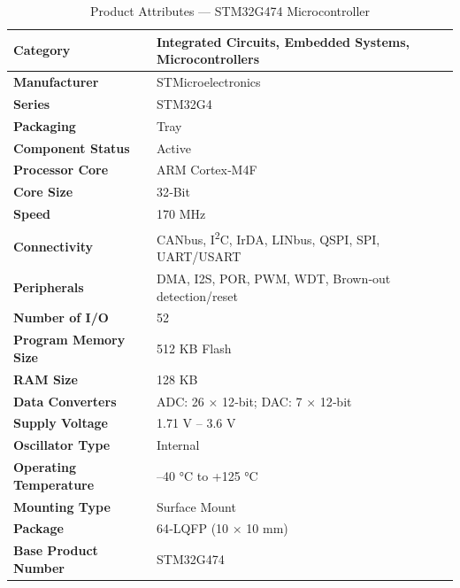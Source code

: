 \begin{table}[H]
    \centering
    \caption{Product Attributes — STM32G474 Microcontroller}
    \label{tab:stm32g474_attributes}
    \begin{tabular}{|l|l|}
        \hline
        \textbf{Category} & Integrated Circuits, Embedded Systems, Microcontrollers \\
        \hline
        \textbf{Manufacturer} & STMicroelectronics \\
        \hline
        \textbf{Series} & STM32G4 \\
        \hline
        \textbf{Packaging} & Tray \\
        \hline
        \textbf{Component Status} & Active \\
        \hline
        \textbf{Processor Core} & ARM Cortex‑M4F \\
        \hline
        \textbf{Core Size} & 32‑Bit \\
        \hline
        \textbf{Speed} & 170 MHz \\
        \hline
        \textbf{Connectivity} & CANbus, I\textsuperscript{2}C, IrDA, LINbus, QSPI, SPI, UART/USART \\
        \hline
        \textbf{Peripherals} & DMA, I2S, POR, PWM, WDT, Brown‑out detection/reset \\
        \hline
        \textbf{Number of I/O} & 52 \\
        \hline
        \textbf{Program Memory Size} & 512 KB Flash \\
        \hline
        \textbf{RAM Size} & 128 KB \\
        \hline
        \textbf{Data Converters} & ADC: 26 × 12‑bit; DAC: 7 × 12‑bit \\
        \hline
        \textbf{Supply Voltage} & 1.71 V – 3.6 V \\
        \hline
        \textbf{Oscillator Type} & Internal \\
        \hline
        \textbf{Operating Temperature} & –40 °C to +125 °C \\
        \hline
        \textbf{Mounting Type} & Surface Mount \\
        \hline
        \textbf{Package} & 64‑LQFP (10 × 10 mm) \\
        \hline
        \textbf{Base Product Number} & STM32G474 \\
        \hline
    \end{tabular}
\end{table}



